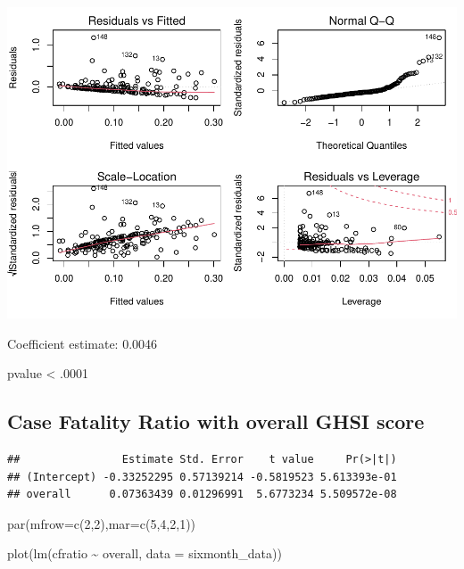 \documentclass[
]{article}
\newenvironment{Shaded}{\begin{snugshade}}{\end{snugshade}}
\newcommand{\AttributeTok}[1]{\textcolor[rgb]{0.77,0.63,0.00}{#1}}
\newcommand{\DecValTok}[1]{\textcolor[rgb]{0.00,0.00,0.81}{#1}}
\newcommand{\FunctionTok}[1]{\textcolor[rgb]{0.00,0.00,0.00}{#1}}
\newcommand{\NormalTok}[1]{#1}
\newcommand{\SpecialCharTok}[1]{\textcolor[rgb]{0.00,0.00,0.00}{#1}}
\begin{document}
\includegraphics{Basic-Regression_files/figure-latex/unnamed-chunk-2-1.pdf}

Coefficient estimate: 0.0046

pvalue \textless{} .0001

\hypertarget{case-fatality-ratio-with-overall-ghsi-score}{%
\subsection{Case Fatality Ratio with overall GHSI
score}\label{case-fatality-ratio-with-overall-ghsi-score}}

\begin{Shaded}
\end{Shaded}

\begin{verbatim}
##                Estimate Std. Error    t value     Pr(>|t|)
## (Intercept) -0.33252295 0.57139214 -0.5819523 5.613393e-01
## overall      0.07363439 0.01296991  5.6773234 5.509572e-08
\end{verbatim}

\begin{Shaded}
\begin{Highlighting}[]
\FunctionTok{par}\NormalTok{(}\AttributeTok{mfrow=}\FunctionTok{c}\NormalTok{(}\DecValTok{2}\NormalTok{,}\DecValTok{2}\NormalTok{),}\AttributeTok{mar=}\FunctionTok{c}\NormalTok{(}\DecValTok{5}\NormalTok{,}\DecValTok{4}\NormalTok{,}\DecValTok{2}\NormalTok{,}\DecValTok{1}\NormalTok{))}

\FunctionTok{plot}\NormalTok{(}\FunctionTok{lm}\NormalTok{(cfratio }\SpecialCharTok{\textasciitilde{}}\NormalTok{ overall, }\AttributeTok{data =}\NormalTok{ sixmonth\_data))}
\end{Highlighting}
\end{Shaded}
\end{document}
